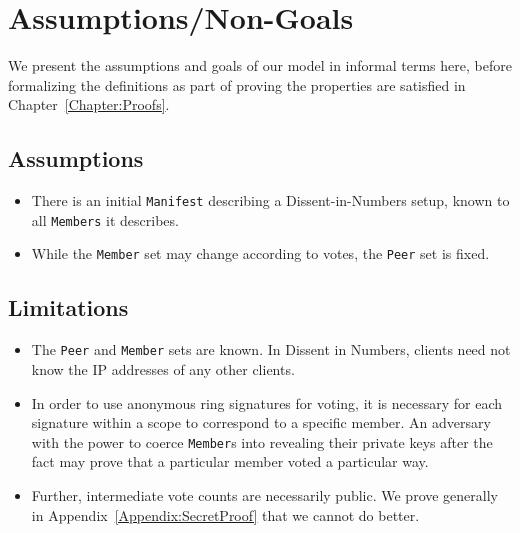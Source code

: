 \section{Assumptions/Non-Goals}
We present the assumptions and goals of our model in informal terms here,
before formalizing the definitions as part of proving the properties are
satisfied in Chapter~\ref{Chapter:Proofs}.
\subsection{Assumptions}
\begin{itemize}
  \item There is an initial \texttt{Manifest} describing a Dissent-in-Numbers
    setup, known to all \texttt{Members} it describes.
  \item While the \texttt{Member} set may change according to votes, the
    \texttt{Peer} set is fixed.
\end{itemize}
\subsection{Limitations}
\begin{itemize}
  \item The \texttt{Peer} and \texttt{Member} sets are known. In Dissent in
    Numbers, clients need not know the IP addresses of any other clients.
  \item In order to use anonymous ring signatures for voting, it is necessary
    for each signature within a scope to correspond to a specific member. An
    adversary with the power to coerce \texttt{Member}s into revealing their
    private keys after the fact may prove that a particular member voted a
    particular way.
  \item Further, intermediate vote counts are necessarily public. We prove
    generally in Appendix~\ref{Appendix:SecretProof} that we cannot do better.
\end{itemize}
